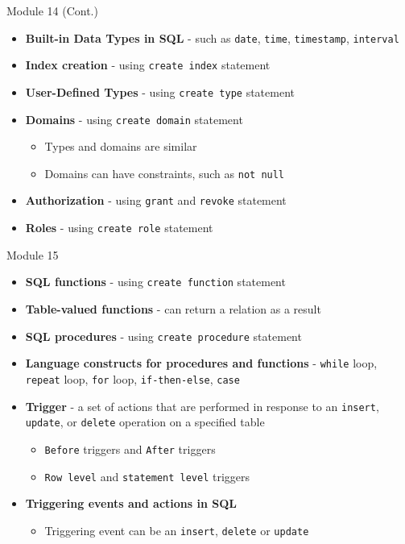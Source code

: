 \documentclass[aspectratio=169, xcolor=dvipsnames]{beamer}
\begin{document}
\begin{frame}{Module 14 (Cont.)}
    \begin{itemize}[<+->]
        \item \textbf{Built-in Data Types in SQL} - such as \texttt{date}, \texttt{time}, \texttt{timestamp}, \texttt{interval}
        \item \textbf{Index creation} - using \texttt{create index} statement
        \item \textbf{User-Defined Types} - using \texttt{create type} statement
        \item \textbf{Domains} - using \texttt{create domain} statement
        \begin{itemize}
            \item[$\triangleright$] Types and domains are similar
            \item[$\triangleright$] Domains can have constraints, such as \texttt{not null}
        \end{itemize}
        \item \textbf{Authorization} - using \texttt{grant} and \texttt{revoke} statement
        \item \textbf{Roles} - using \texttt{create role} statement
    \end{itemize}
\end{frame}

\begin{frame}{Module 15}
    \begin{itemize}[<+->]
        \item \textbf{SQL functions} - using \texttt{create function} statement
        \item \textbf{Table-valued functions} - can return a relation as a result
        \item \textbf{SQL procedures} - using \texttt{create procedure} statement
        \item \textbf{Language constructs for procedures and functions} - \texttt{while} loop, \texttt{repeat} loop, \texttt{for} loop, \texttt{if-then-else}, \texttt{case}
        \item \textbf{Trigger} - a set of actions that are performed in response to an \texttt{insert}, \texttt{update}, or \texttt{delete} operation on a specified table
        \begin{itemize}
            \item[$\triangleright$] \texttt{Before} triggers and \texttt{After} triggers
            \item[$\triangleright$] \texttt{Row level} and \texttt{statement level} triggers
        \end{itemize}
        \item \textbf{Triggering events and actions in SQL}
        \begin{itemize}
            \item[$\triangleright$] Triggering event can be an \texttt{insert}, \texttt{delete} or \texttt{update}
        \end{itemize}
    \end{itemize}
\end{frame}
\end{document}
